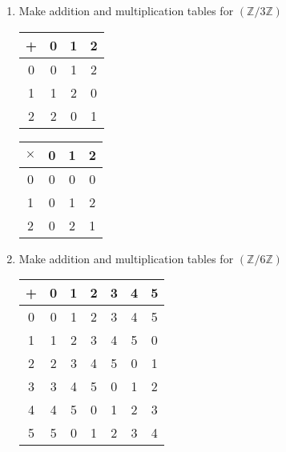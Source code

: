 \documentclass[a4paper, 11pt]{article}
\begin{document}
    \begin{enumerate}[label=(\alph*)]
        \item Make addition and multiplication tables for $(\mathbb{Z}/3\mathbb{Z})$\\
            \begin{tabular}{ |c|c|c|c| } 
                \hline
                    + & 0 & 1 & 2\\ 
                \hline
                    0 & 0 & 1 & 2\\ 
                \hline
                    1 & 1 & 2 & 0\\
                \hline
                    2 & 2 & 0 & 1\\
                \hline
            \end{tabular}
            \quad
            \begin{tabular}{ |c|c|c|c| } 
                \hline
                    $\times$ & 0 & 1 & 2\\ 
                \hline
                    0 & 0 & 0 & 0\\ 
                \hline
                    1 & 0 & 1 & 2\\
                \hline
                    2 & 0 & 2 & 1\\
                \hline
            \end{tabular}
        \item Make addition and multiplication tables for $(\mathbb{Z}/6\mathbb{Z})$\\
            \begin{tabular}{ |c|c|c|c|c|c|c| } 
                \hline
                    + & 0 & 1 & 2 & 3 & 4 & 5\\ 
                \hline
                    0 & 0 & 1 & 2 & 3 & 4 & 5\\ 
                \hline
                    1 & 1 & 2 & 3 & 4 & 5 & 0\\ 
                \hline
                    2 & 2 & 3 & 4 & 5 & 0 & 1\\ 
                \hline
                    3 & 3 & 4 & 5 & 0 & 1 & 2\\ 
                \hline
                    4 & 4 & 5 & 0 & 1 & 2 & 3\\  
                \hline
                    5 & 5 & 0 & 1 & 2 & 3 & 4\\ 
                \hline
            \end{tabular}
            \quad
            \begin{tabular}{ |c|c|c|c|c|c|c| } 

\end{tabular}
\end{enumerate}
\end{document}
